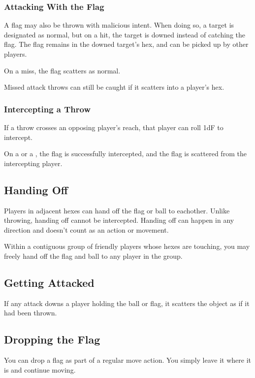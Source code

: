 \subsubsection{Attacking With the Flag} 
A flag may also be thrown with malicious intent.
When doing so, a target is designated as normal, but on a hit, the target is downed instead of catching the flag.
The flag remains in the downed target's hex, and can be picked up by other players.

On a miss, the flag scatters as normal.

\begin{note}
    Missed attack throws can still be caught if it scatters into a player's hex.
\end{note}

\subsubsection{Intercepting a Throw} \label{interception}
If a throw crosses an opposing player's reach, that player can roll 1dF to intercept.

On a \plus{} or a \blank{}, the flag is successfully intercepted, and the flag is scattered from the intercepting player.

\subsection{Handing Off}\label{handing-off}
Players in adjacent hexes can hand off the flag or ball to eachother.
Unlike throwing, handing off cannot be intercepted.
Handing off can happen in any direction and doesn't count as an action or movement.

\begin{note}
    Within a contiguous group of friendly players whose hexes are touching, you may freely hand off the flag and ball to any player in the group.
\end{note}

\subsection{Getting Attacked}
If any attack downs a player holding the ball or flag, it scatters the object as if it had been thrown.

\subsection{Dropping the Flag}
You can drop a flag as part of a regular move action.
You simply leave it where it is and continue moving.

